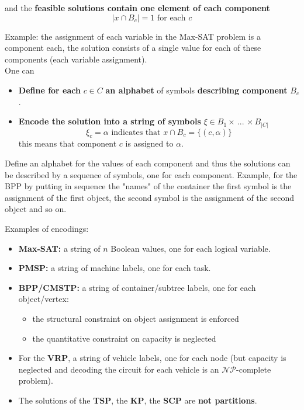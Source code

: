 \documentclass[11pt]{article}
\begin{document}
	and the \textbf{feasible solutions contain one element of each component}
	$$ |x \cap B_c| = 1 \text{ for each } c$$
	
	Example: the assignment of each variable in the Max-SAT problem is a component each, the solution consists of a single value for each of these components (each variable assignment).\\
	
	One can
	\begin{itemize}
		\item \textbf{Define for each} $c \in C$ \textbf{an alphabet} of symbols \textbf{describing component} $B_c$.\\
		
		\item \textbf{Encode the solution into a string of symbols} $\xi \in B_1 \times \, ... \, \times B_{|C |}$
		$$ \xi_c = \alpha \text{ indicates that } x \cap B_c = \{(c, \alpha)\} $$ 
		this means that component $c$ is assigned to $\alpha$.\\
	\end{itemize}
	
	Define an alphabet for the values of each component and thus the solutions can be described by a sequence of symbols, one for each component. Example, for the BPP by putting in sequence the "names" of the container the first symbol is the assignment of the first object, the second symbol is the assignment of the second object and so on.\\
	
	\newpage
	
	Examples of encodings:
	\begin{itemize}
		\item \textbf{Max-SAT:} a string of $n$ Boolean values, one for each logical variable.\\
		
		\item \textbf{PMSP:} a string of machine labels, one for each task.\\
		
		\item \textbf{BPP/CMSTP:} a string of container/subtree labels, one for each object/vertex:
		\begin{itemize}
			\item the structural constraint on object assignment is enforced
			\item the quantitative constraint on capacity is neglected
		\end{itemize}
		\nn
		
		\item For the \textbf{VRP}, a string of vehicle labels, one for each node (but capacity is neglected and decoding the circuit for each vehicle is an $\mathcal{NP}$-complete problem).\\
		
		\item The solutions of the \textbf{TSP}, the \textbf{KP}, the \textbf{SCP} are \textbf{not partitions}.\\
	\end{itemize}
	
\end{document}
